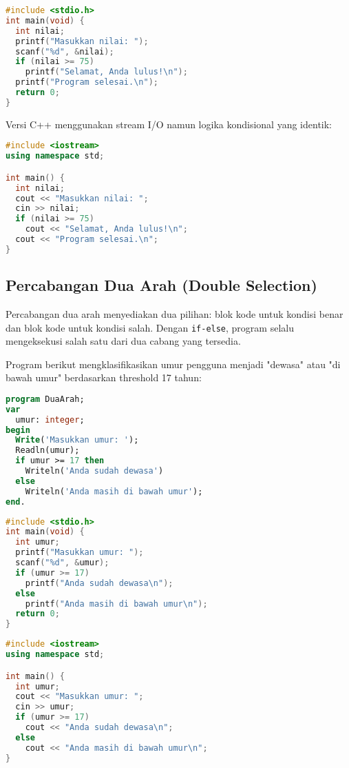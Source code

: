 \documentclass[../main.tex]{subfiles}
\begin{document}
\begin{lstlisting}[language=C, caption={Percabangan satu arah di C}]
#include <stdio.h>
int main(void) {
  int nilai;
  printf("Masukkan nilai: ");
  scanf("%d", &nilai);
  if (nilai >= 75)
    printf("Selamat, Anda lulus!\n");
  printf("Program selesai.\n");
  return 0;
}
\end{lstlisting}

Versi C++ menggunakan stream I/O namun logika kondisional yang identik:

\begin{lstlisting}[language=C++, caption={Percabangan satu arah di C++}]
#include <iostream>
using namespace std;

int main() {
  int nilai;
  cout << "Masukkan nilai: ";
  cin >> nilai;
  if (nilai >= 75)
    cout << "Selamat, Anda lulus!\n";
  cout << "Program selesai.\n";
}
\end{lstlisting}

\subsection{Percabangan Dua Arah (Double Selection)}
Percabangan dua arah menyediakan dua pilihan: blok kode untuk kondisi benar dan blok kode untuk kondisi salah. Dengan \texttt{if-else}, program selalu mengeksekusi salah satu dari dua cabang yang tersedia.

Program berikut mengklasifikasikan umur pengguna menjadi "dewasa" atau "di bawah umur" berdasarkan threshold 17 tahun:

\begin{lstlisting}[language=Pascal, caption={Percabangan dua arah di Pascal}]
program DuaArah;
var
  umur: integer;
begin
  Write('Masukkan umur: ');
  Readln(umur);
  if umur >= 17 then
    Writeln('Anda sudah dewasa')
  else
    Writeln('Anda masih di bawah umur');
end.
\end{lstlisting}

\begin{lstlisting}[language=C, caption={Percabangan dua arah di C}]
#include <stdio.h>
int main(void) {
  int umur;
  printf("Masukkan umur: ");
  scanf("%d", &umur);
  if (umur >= 17)
    printf("Anda sudah dewasa\n");
  else
    printf("Anda masih di bawah umur\n");
  return 0;
}
\end{lstlisting}

\begin{lstlisting}[language=C++, caption={Percabangan dua arah di C++}]
#include <iostream>
using namespace std;

int main() {
  int umur;
  cout << "Masukkan umur: ";
  cin >> umur;
  if (umur >= 17)
    cout << "Anda sudah dewasa\n";
  else
    cout << "Anda masih di bawah umur\n";
}
\end{lstlisting}
\end{document}
